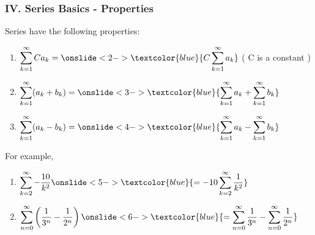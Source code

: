 \begin{frame}
\frametitle{IV. Series Basics - Properties}
\scriptsize

Series have the following properties:

\vspace{0.3cm}

\begin{enumerate}
	\item $\displaystyle{\sum \limits_{k=1}^{\infty} C a_k = \onslide<2->{\textcolor{blue}{C \sum \limits_{k=1}^{\infty} a_k}}}$  \qquad ( C is a constant )
	\vspace{0.1cm}
	\item $\displaystyle{\sum \limits_{k=1}^{\infty} ( a_k + b_k ) = \onslide<3->{\textcolor{blue}{\sum \limits_{k=1}^{\infty} a_k + \sum \limits_{k=1}^{\infty} b_k}}}$
	\vspace{0.1cm}
	\item $\displaystyle{\sum \limits_{k=1}^{\infty} ( a_k - b_k ) = \onslide<4->{\textcolor{blue}{\sum \limits_{k=1}^{\infty} a_k - \sum \limits_{k=1}^{\infty} b_k}}}$
\end{enumerate}

\vspace{0.2cm}

For example,

\vspace{0.2cm}

\begin{enumerate}
	\item $\displaystyle{\sum \limits_{k=2}^{\infty} -\frac{10}{k^2} \onslide<5->{\textcolor{blue}{ = -10 \sum \limits_{k=2}^{\infty} \frac{1}{k^2}}}}$
	\vspace{0.1cm}
	\item $\displaystyle{\sum \limits_{n=0}^{\infty} \left(\frac{1}{3^n} - \frac{1}{2^n}\right) \onslide<6->{\textcolor{blue}{= \sum \limits_{n=0}^{\infty} \frac{1}{3^n} - \sum \limits_{n=0}^{\infty} \frac{1}{2^n}}}}$
\end{enumerate}

\end{frame}


